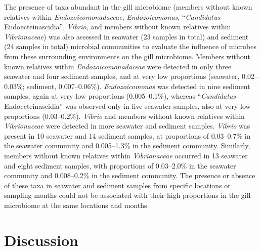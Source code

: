 \documentclass[
  12 pt,
]{article}
\begin{document}
The presence of taxa abundant in the gill microbiome (members without known relatives within \emph{Endozoicomonadaceae}, \emph{Endozoicomonas}, ``\emph{Candidatus} Endoecteinascidia'', \emph{Vibrio}, and members without known relatives within \emph{Vibrionaceae}) was also assessed in seawater (23 samples in total) and sediment (24 samples in total) microbial communities to evaluate the influence of microbes from these surrounding environments on the gill microbiome. Members without known relatives within \emph{Endozoicomonadaceae} were detected in only three seawater and four sediment samples, and at very low proportions (seawater, 0.02--0.03\unit{\percent}; sediment, 0.007--0.06\unit{\percent}). \emph{Endozoicomonas} was detected in nine sediment samples, again at very low proportions (0.005--0.1\unit{\percent}), whereas ``\emph{Candidatus} Endoecteinascidia'' was observed only in five seawater samples, also at very low proportions (0.03--0.2\unit{\percent}). \emph{Vibrio} and members without known relatives within \emph{Vibrionaceae} were detected in more seawater and sediment samples. \emph{Vibrio} was present in 10 seawater and 14 sediment samples, at proportions of 0.03--0.7\unit{\percent} in the seawater community and 0.005--1.3\unit{\percent} in the sediment community. Similarly, members without known relatives within \emph{Vibrionaceae} occurred in 13 seawater and eight sediment samples, with proportions of 0.03--2.0\unit{\percent} in the seawater community and 0.008--0.2\unit{\percent} in the sediment community. The presence or absence of these taxa in seawater and sediment samples from specific locations or sampling months could not be associated with their high proportions in the gill microbiome at the same locations and months.
\newpage

\section{Discussion}\label{discussion}
\end{document}
